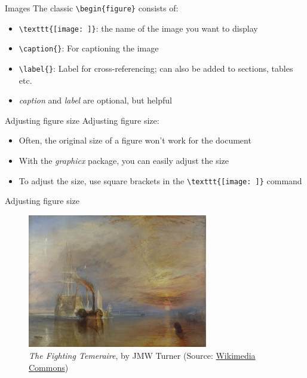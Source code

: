\documentclass{beamer}
\begin{document}
\begin{frame}[fragile]{Images}
The classic \verb|\begin{figure}| consists of:\\
\vspace{1.5mm}
\begin{itemize}
    \item \verb|\texttt{[image: ]}|: the name of the image you want to display
    \item \verb|\caption{}|: For captioning the image
    \item \verb|\label{}|: Label for cross-referencing; can also be added to sections, tables etc.
    \item \textit{caption} and \textit{label} are optional, but helpful
\end{itemize}    
\end{frame}

\begin{frame}[fragile]{Adjusting figure size}
Adjusting figure size:\\    
\begin{itemize}
    \item Often, the original size of a figure won't work for the document
    \item With the \textit{graphicx} package, you can easily adjust the size
    \item To adjust the size, use square brackets in the \verb|\texttt{[image: ]}| command
\end{itemize}
\end{frame}

\begin{frame}{Adjusting figure size}
\begin{figure}
    \centering
    \includegraphics[width=0.7\textwidth]{temeraire.jpg}
    \caption{\textit{The Fighting Temeraire}, by JMW Turner (Source: \href{https://commons.wikimedia.org/wiki/File:The_Fighting_Temeraire,_JMW_Turner,_National_Gallery.jpg}{Wikimedia Commons})}
    \label{fig:temeraire_normal}
\end{figure}    
\end{frame}
\end{document}
